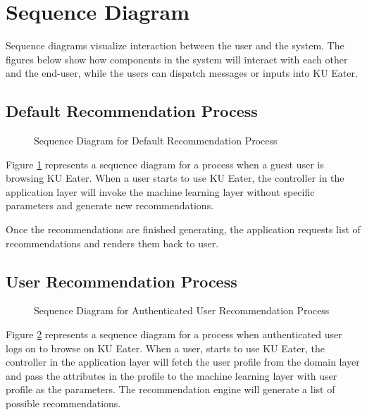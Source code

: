 \section{Sequence Diagram}
\label{section:sequence-diagram}

Sequence diagrams visualize interaction between the user and the system. The figures below show how components in the system will interact with
each other and the end-user, while the users can dispatch messages or inputs into KU Eater.

\subsection{Default Recommendation Process}
\begin{figure}[h!]
    \centering
    \caption{Sequence Diagram for Default Recommendation Process}
    \label{fig:seq-default-recommendation-process}
\end{figure}

Figure \ref{fig:seq-default-recommendation-process} represents a sequence diagram for a process when a guest user is browsing KU Eater. When a user
starts to use KU Eater, the controller in the application layer will invoke the machine learning layer without specific parameters and generate new recommendations.

Once the recommendations are finished generating, the application requests list of recommendations and renders them back to user.

\subsection{User Recommendation Process}
\begin{figure}[h!]
    \centering
    \caption{Sequence Diagram for Authenticated User Recommendation Process}
    \label{fig:seq-user-recommendation-process}
\end{figure}

Figure \ref{fig:seq-user-recommendation-process} represents a sequence diagram for a process when authenticated user logs on to browse on KU Eater.
When a user, starts to use KU Eater, the controller in the application layer will fetch the user profile from the domain layer and pass the attributes in the profile to
the machine learning layer with user profile as the parameters. The recommendation engine will generate a list of possible recommendations.

